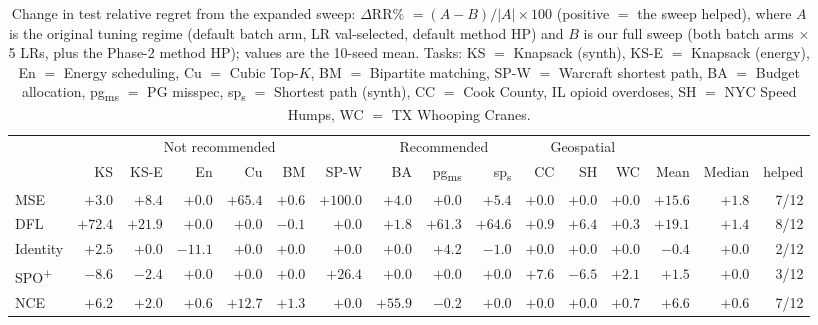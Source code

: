 \begin{table}[t]
\centering
\small
\caption{Change in test relative regret from the expanded sweep: $\Delta$RR\% $=(A-B)/|A|\times100$ (positive $=$ the sweep helped), where $A$ is the original tuning regime (default batch arm, LR val-selected, default method HP) and $B$ is our full sweep (both batch arms $\times$ 5 LRs, plus the Phase-2 method HP); values are the 10-seed mean. Tasks: KS $=$ Knapsack (synth), KS-E $=$ Knapsack (energy), En $=$ Energy scheduling, Cu $=$ Cubic Top-$K$, BM $=$ Bipartite matching, SP-W $=$ Warcraft shortest path, BA $=$ Budget allocation, pg\textsubscript{ms} $=$ PG misspec, sp\textsubscript{s} $=$ Shortest path (synth), CC $=$ Cook County, IL opioid overdoses, SH $=$ NYC Speed Humps, WC $=$ TX Whooping Cranes.}
\label{tab:notrec-rec-geo-spw-regret-change-mean-paper}
\setlength{\tabcolsep}{3pt}
\renewcommand{\arraystretch}{1.1}
\begin{tabular}{@{}lrrrrrrrrrrrrrrr@{}}
\toprule
 & \multicolumn{6}{c}{Not recommended} & \multicolumn{3}{c}{Recommended} & \multicolumn{3}{c}{Geospatial} &  &  &  \\
\cmidrule(lr){2-7}\cmidrule(lr){8-10}\cmidrule(lr){11-13}
 & KS & KS-E & En & Cu & BM & SP-W & BA & pg\textsubscript{ms} & sp\textsubscript{s} & CC & SH & WC & Mean & Median & helped \\
\midrule
MSE & $+3.0$ & \cellcolor{green!18}$+8.4$ & $+0.0$ & \cellcolor{green!28}$+65.4$ & $+0.6$ & \cellcolor{green!28}$+100.0$ & $+4.0$ & $+0.0$ & \cellcolor{green!18}$+5.4$ & $+0.0$ & $+0.0$ & $+0.0$ & \cellcolor{green!18}$+15.6$ & $+1.8$ & 7/12 \\
DFL & \cellcolor{green!28}$+72.4$ & \cellcolor{green!18}$+21.9$ & $+0.0$ & $+0.0$ & $-0.1$ & $+0.0$ & $+1.8$ & \cellcolor{green!28}$+61.3$ & \cellcolor{green!28}$+64.6$ & $+0.9$ & \cellcolor{green!18}$+6.4$ & $+0.3$ & \cellcolor{green!18}$+19.1$ & $+1.4$ & 8/12 \\
Identity & $+2.5$ & $+0.0$ & \cellcolor{red!18}$-11.1$ & $+0.0$ & $+0.0$ & $+0.0$ & $+0.0$ & $+4.2$ & $-1.0$ & $+0.0$ & $+0.0$ & $+0.0$ & $-0.4$ & $+0.0$ & 2/12 \\
SPO\textsuperscript{+} & \cellcolor{red!18}$-8.6$ & $-2.4$ & $+0.0$ & $+0.0$ & $+0.0$ & \cellcolor{green!28}$+26.4$ & $+0.0$ & $+0.0$ & $+0.0$ & \cellcolor{green!18}$+7.6$ & \cellcolor{red!18}$-6.5$ & $+2.1$ & $+1.5$ & $+0.0$ & 3/12 \\
NCE & \cellcolor{green!18}$+6.2$ & $+2.0$ & $+0.6$ & \cellcolor{green!18}$+12.7$ & $+1.3$ & $+0.0$ & \cellcolor{green!28}$+55.9$ & $-0.2$ & $+0.0$ & $+0.0$ & $+0.0$ & $+0.7$ & \cellcolor{green!18}$+6.6$ & $+0.6$ & 7/12 \\

\end{tabular}
\end{table}
